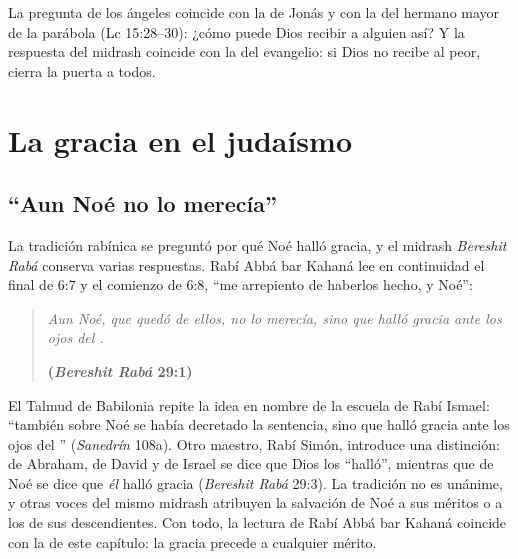 
La pregunta de los ángeles coincide con la de Jonás y con la del hermano mayor de la parábola (Lc 15:28--30): ¿cómo puede Dios recibir a alguien así? Y la respuesta del midrash coincide con la del evangelio: si Dios no recibe al peor, cierra la puerta a todos.

\section{La gracia en el judaísmo}\label{sec:judaismo-gracia}

\subsection{“Aun Noé no lo merecía”}
La tradición rabínica se preguntó por qué Noé halló gracia, y el midrash \emph{Bereshit Rabá} conserva varias respuestas. Rabí Abbá bar Kahaná lee en continuidad el final de 6:7 y el comienzo de 6:8, ``me arrepiento de haberlos hecho, y Noé'':

\begin{quote}\itshape
Aun Noé, que quedó de ellos, no lo merecía, sino que halló gracia ante los ojos del \SENOR.\par\hfill{\upshape\small\bfseries\textcolor{azulp}{(\emph{Bereshit Rabá} 29:1)}}
\end{quote}


El Talmud de Babilonia repite la idea en nombre de la escuela de Rabí Ismael: ``también sobre Noé se había decretado la sentencia, sino que halló gracia ante los ojos del \SENOR'' (\emph{Sanedrín} 108a). Otro maestro, Rabí Simón, introduce una distinción: de Abraham, de David y de Israel se dice que Dios los ``halló'', mientras que de Noé se dice que \emph{él} halló gracia (\emph{Bereshit Rabá} 29:3). La tradición no es unánime, y otras voces del mismo midrash atribuyen la salvación de Noé a sus méritos o a los de sus descendientes. Con todo, la lectura de Rabí Abbá bar Kahaná coincide con la de este capítulo: la gracia precede a cualquier mérito.

